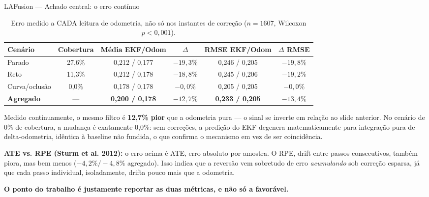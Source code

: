 \documentclass[aspectratio=169]{beamer}
\begin{document}
\begin{frame}{LAFusion — Achado central: o erro contínuo}
\begin{table}
\scriptsize
\begin{tabular}{lccccc}
\toprule
\textbf{Cenário} & \textbf{Cobertura} & \textbf{Média EKF/Odom} & \textbf{$\Delta$} & \textbf{RMSE EKF/Odom} & \textbf{$\Delta$ RMSE} \\
\midrule
Parado & 27,6\% & 0,212 / 0,177 & $-19,3\%$ & 0,246 / 0,205 & $-19,8\%$ \\
Reto & 11,3\% & 0,212 / 0,178 & $-18,8\%$ & 0,245 / 0,206 & $-19,2\%$ \\
Curva/oclusão & 0,0\% & 0,178 / 0,178 & $-0,0\%$ & 0,205 / 0,205 & $-0,0\%$ \\
\textbf{Agregado} & --- & \textbf{0,200 / 0,178} & \textbf{$-12{,}7\%$} & \textbf{0,233 / 0,205} & \textbf{$-13{,}4\%$} \\
\bottomrule
\end{tabular}
\caption{\small Erro medido a CADA leitura de odometria, não só nos instantes de correção ($n=1607$, Wilcoxon $p<0{,}001$).}
\end{table}

Medido continuamente, o mesmo filtro é \textbf{12,7\% pior} que a odometria pura — o sinal se inverte em relação ao slide anterior. No cenário de 0\% de cobertura, a mudança é exatamente 0,0\%: sem correções, a predição do EKF degenera matematicamente para integração pura de delta-odometria, idêntica à baseline não fundida, o que confirma o mecanismo em vez de ser coincidência.

\vspace{0.15cm}
\scriptsize\textbf{ATE vs. RPE (Sturm et al. 2012):} o erro acima é ATE, erro absoluto por amostra. O RPE, drift entre passos consecutivos, também piora, mas bem menos ($-4,2\%/-4,8\%$ agregado). Isso indica que a reversão vem sobretudo de erro \emph{acumulando} sob correção esparsa, já que cada passo individual, isoladamente, drifta pouco mais que a odometria.

\vspace{0.1cm}
\small \textbf{O ponto do trabalho é justamente reportar as duas métricas, e não só a favorável.}
\end{frame}
\end{document}

